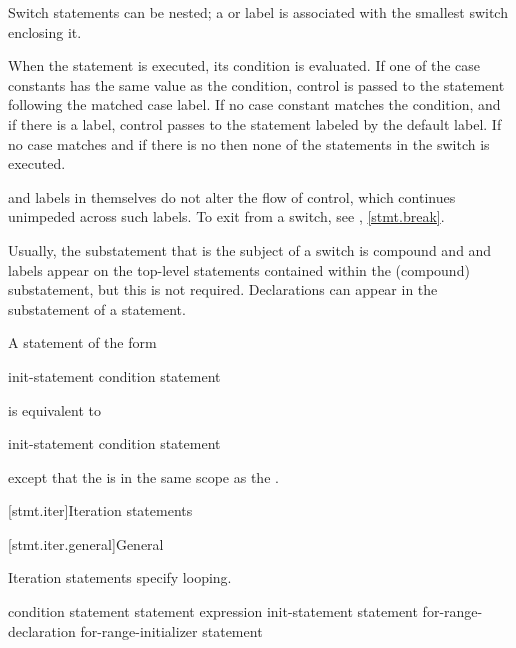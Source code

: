 \pnum
Switch statements can be nested; a  or  label
is associated with the smallest switch enclosing it.

\pnum
When the  statement is executed, its condition is
evaluated.
%
If one of the case constants has the same value as the condition,
control is passed to the statement following the matched case label. If
no case constant matches the condition, and if there is a
%
 label, control passes to the statement labeled by the
default label. If no case matches and if there is no 
then none of the statements in the switch is executed.

\pnum
{} and  labels in themselves do not alter the
flow of control, which continues unimpeded across such labels. To exit
from a switch, see , \ref{stmt.break}.
\begin{note}
Usually, the substatement that is the subject of a switch is compound
and  and  labels appear on the top-level
statements contained within the (compound) substatement, but this is not
required.
%
Declarations can appear in the substatement of a
 statement.
\end{note}

\pnum
A  statement of the form
\begin{ncsimplebnf}
 \terminal{(} init-statement condition \terminal{)} statement
\end{ncsimplebnf}
is equivalent to
\begin{ncsimplebnf}
\terminal{\{}\br
\bnfindent init-statement\br
\bnfindent {} \terminal{(} condition \terminal{)} statement\br
\terminal{\}}
\end{ncsimplebnf}
except that the  is in
the same scope as the .


[stmt.iter]{Iteration statements}%

[stmt.iter.general]{General}%

\pnum
Iteration statements specify looping.

%
%
%
%
\begin{bnf}
\br
     \terminal{(} condition \terminal{)} statement\br
     statement  \terminal{(} expression \terminal{)} \terminal{;}\br
     \terminal{(} init-statement  \terminal{;}  \terminal{)} statement\br
     \terminal{(}  for-range-declaration \terminal{:} for-range-initializer \terminal{)} statement
\end{bnf}

